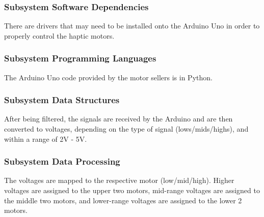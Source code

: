 \subsubsection{Subsystem Software Dependencies}
There are drivers that may need to be installed onto the Arduino Uno in order to properly control the haptic motors.

\subsubsection{Subsystem Programming Languages}
The Arduino Uno code provided by the motor sellers is in Python.

\subsubsection{Subsystem Data Structures}
After being filtered, the signals are received by the Arduino and are then converted to voltages, depending on the type of signal (lows/mids/highs), and within a range of 2V - 5V.

\subsubsection{Subsystem Data Processing}
The voltages are mapped to the respective motor (low/mid/high). Higher voltages are assigned to the upper two motors, mid-range voltages are assigned to the middle two motors, and lower-range voltages are assigned to the lower 2 motors. 


